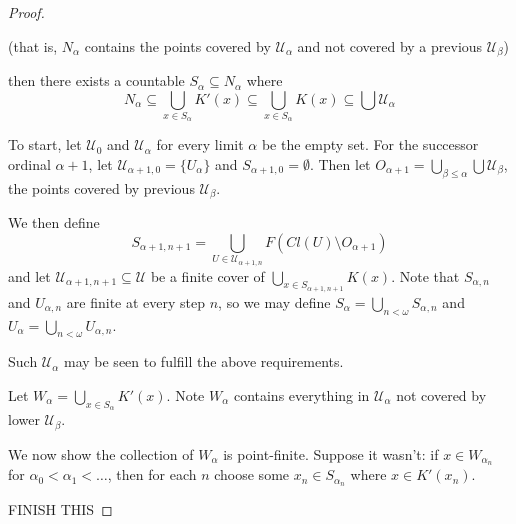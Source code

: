 \documentclass[11pt]{article}
\theoremstyle{plain}
\theoremstyle{definition}
\theoremstyle{remark}
\newcommand{\<}{\langle}
\renewcommand{\>}{\rangle}
\begin{document}
\begin{proof}
\begin{itemize}
(that is, $N_\alpha$ contains the points covered by $\mathcal{U}_\alpha$ and not covered by a previous $\mathcal{U}_\beta$)

then there exists a countable $S_\alpha\subseteq N_\alpha$ where \[ N_\alpha \subseteq \bigcup_{x\in S_\alpha} K'(x) \subseteq \bigcup_{x\in S_\alpha} K(x) \subseteq \bigcup \mathcal{U}_\alpha\]
\end{itemize}

To start, let $\mathcal{U}_0$ and $\mathcal{U}_\alpha$ for every limit $\alpha$ be the empty set. For the successor ordinal $\alpha+1$, let $\mathcal{U}_{\alpha+1,0}=\{U_\alpha\}$ and $S_{\alpha+1,0}=\emptyset$. Then let $O_{\alpha+1}=\bigcup_{\beta\leq\alpha}\bigcup\mathcal{U}_\beta$, the points covered by previous $\mathcal{U}_\beta$.

We then define \[S_{\alpha+1,n+1}=\bigcup_{U\in\mathcal{U}_{\alpha+1,n}} F(Cl(U)\setminus O_{\alpha+1})\] and let $\mathcal{U}_{\alpha+1,n+1}\subseteq \mathcal{U}$ be a finite cover of $\bigcup_{x \in S_{\alpha+1,n+1}} K(x)$. Note that $S_{\alpha,n}$ and $U_{\alpha,n}$ are finite at every step $n$, so we may define $S_\alpha = \bigcup_{n<\omega} S_{\alpha,n}$ and $U_\alpha=\bigcup_{n<\omega} U_{\alpha,n}$.

Such $\mathcal{U}_\alpha$ may be seen to fulfill the above requirements.

Let $W_\alpha = \bigcup_{x\in S_\alpha} K'(x)$. Note $W_\alpha$ contains everything in $\mathcal{U}_\alpha$ not covered by lower $\mathcal{U}_\beta$.

We now show the collection of $W_\alpha$ is point-finite. Suppose it wasn't: if $x \in W_{\alpha_n}$ for $\alpha_0<\alpha_1<\dots$, then for each $n$ choose some $x_n \in S_{\alpha_n}$ where $x \in K'(x_n)$.

FINISH THIS

\end{proof}
\end{document}
